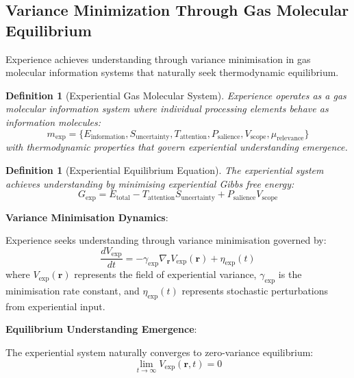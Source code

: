 \documentclass{article}
\newtheorem{definition}[theorem]{Definition}
\begin{document}
\subsection{Variance Minimization Through Gas Molecular Equilibrium}

Experience achieves understanding through variance minimisation in gas molecular information systems that naturally seek thermodynamic equilibrium.

\begin{definition}[Experiential Gas Molecular System]
Experience operates as a gas molecular information system where individual processing elements behave as information molecules:
\begin{equation}
m_{\text{exp}} = \{E_{\text{information}}, S_{\text{uncertainty}}, T_{\text{attention}}, P_{\text{salience}}, V_{\text{scope}}, \mu_{\text{relevance}}\}
\end{equation}
with thermodynamic properties that govern experiential understanding emergence.
\end{definition}

\begin{definition}[Experiential Equilibrium Equation]
The experiential system achieves understanding by minimising experiential Gibbs free energy:
\begin{equation}
G_{\text{exp}} = E_{\text{total}} - T_{\text{attention}} S_{\text{uncertainty}} + P_{\text{salience}} V_{\text{scope}}
\end{equation}
\end{definition}

\textbf{Variance Minimisation Dynamics}:

Experience seeks understanding through variance minimisation governed by:
\begin{equation}
\frac{dV_{\text{exp}}}{dt} = -\gamma_{\text{exp}} \nabla_{\mathbf{r}} V_{\text{exp}}(\mathbf{r}) + \eta_{\text{exp}}(t)
\end{equation}
where $V_{\text{exp}}(\mathbf{r})$ represents the field of experiential variance, $\gamma_{\text{exp}}$ is the minimisation rate constant, and $\eta_{\text{exp}}(t)$ represents stochastic perturbations from experiential input.

\textbf{Equilibrium Understanding Emergence}:

The experiential system naturally converges to zero-variance equilibrium:
\begin{equation}
\lim_{t \to \infty} V_{\text{exp}}(\mathbf{r}, t) = 0
\end{equation}
\end{document}
